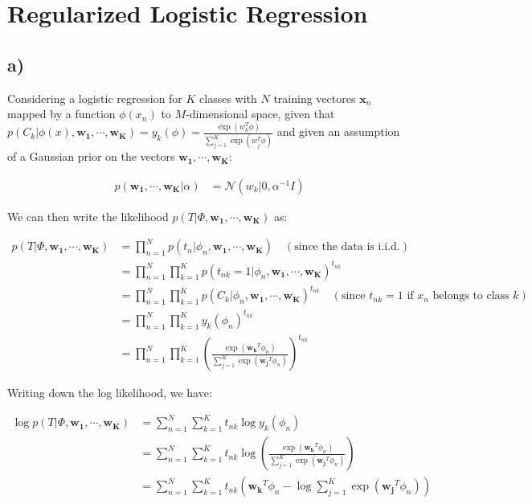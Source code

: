 \documentclass[12pt,a4paper,oneside]{paper}
\begin{document}
\newpage
\section{Regularized Logistic Regression}

\subsection*{a)}

Considering a logistic regression for $K$ classes with $N$ training vectores $\bm{x}_n$ mapped by a function $\phi(x_n)$ to $M$-dimensional space, given that $p(C_k | \phi(x), \bm{w_1}, \cdots, \bm{w_K}) = y_k(\phi) = \frac{\exp(w_k^T \phi)}{\sum_{j=1}^{K} \exp(w_j^T \phi)}$ and given an assumption of a Gaussian prior on the vectors $\bm{w_1}, \cdots, \bm{w_K}$:

\begin{align*}
    p(\bm{w_1}, \cdots, \bm{w_K} | \alpha) &= \mathcal{N}(w_k | 0, \alpha^{-1} I)
\end{align*}

We can then write the likelihood $p(T | \Phi, \bm{w_1}, \cdots, \bm{w_K})$ as:

\begin{align*}
    p(T | \Phi, \bm{w_1}, \cdots, \bm{w_K}) &= \prod_{n=1}^{N} p(t_n | \phi_n, \bm{w_1}, \cdots, \bm{w_K}) \quad {(\text{since the data is i.i.d.})} \\
    &= \prod_{n=1}^{N} \prod_{k=1}^{K} p(t_{nk} = 1 | \phi_n, \bm{w_1}, \cdots, \bm{w_K})^{t_{nk}} \\
    &= \prod_{n=1}^{N} \prod_{k=1}^{K} p(C_k | \phi_n, \bm{w_1}, \cdots, \bm{w_K})^{t_{nk}} \quad {(\text{since } t_{nk} = 1 \text{ if } x_n \text{ belongs to class } k)} \\
    &= \prod_{n=1}^{N} \prod_{k=1}^{K} y_k(\phi_n)^{t_{nk}} \\
    &= \prod_{n=1}^{N} \prod_{k=1}^{K} \left(\frac{\exp(\bm{w_k}^T \phi_n)}{\sum_{j=1}^{K} \exp(\bm{w_j}^T \phi_n)}\right)^{t_{nk}}
\end{align*}

Writing down the log likelihood, we have:

\begin{align*}
    \log p(T | \Phi, \bm{w_1}, \cdots, \bm{w_K}) &= \sum_{n=1}^{N} \sum_{k=1}^{K} t_{nk} \log y_k(\phi_n) \\
    &= \sum_{n=1}^{N} \sum_{k=1}^{K} t_{nk} \log \left(\frac{\exp(\bm{w_k}^T \phi_n)}{\sum_{j=1}^{K} \exp(\bm{w_j}^T \phi_n)}\right) \\
    &= \sum_{n=1}^{N} \sum_{k=1}^{K} t_{nk} \left(\bm{w_k}^T \phi_n - \log \sum_{j=1}^{K} \exp(\bm{w_j}^T \phi_n)\right)
\end{align*}
\end{document}
